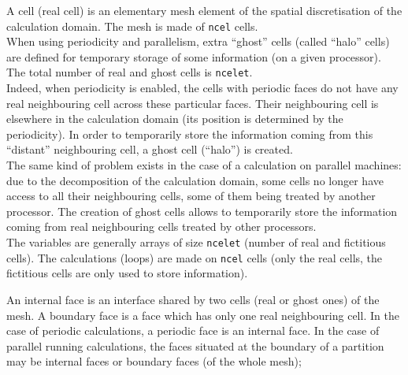 {{{


A cell (real cell) is an elementary mesh element of the spatial
discretisation of the calculation domain. The mesh is made of \texttt{ncel} cells.\\
When using periodicity and parallelism, extra ``ghost'' cells
(called ``halo'' cells) are defined for temporary storage of some information
(on a given processor).
The total number of real and ghost cells is \texttt{ncelet}. \\
\hspace*{1cm} Indeed, when periodicity is enabled, the cells with
periodic faces do not have any real neighbouring cell across these
particular faces. Their neighbouring cell is elsewhere in the calculation
domain (its position is determined by the periodicity). In order to
temporarily store the information coming from this ``distant''
neighbouring cell, a ghost cell (``halo'') is created. \\
\hspace*{1cm} The same kind of problem exists in the case of a
calculation on parallel machines: due to the decomposition of the
calculation domain, some cells no longer have access to all
their neighbouring cells, some of them being treated by another processor. The
creation of ghost cells allows to temporarily store the information
coming from real neighbouring cells treated by other processors.\\
The variables are generally arrays of size \texttt{ncelet} (number of real and
fictitious cells). The calculations (loops) are made on \texttt{ncel} cells (only
the real cells, the fictitious cells are only used to store information).

An internal face is an interface shared by two cells (real or ghost
ones) of the mesh. A boundary face is a face which has only one real
neighbouring cell. In the case of periodic calculations, a periodic face
is an internal face. In the case of parallel running calculations, the
faces situated at the boundary of a partition may be internal faces or
boundary faces (of the whole mesh);

}}}
